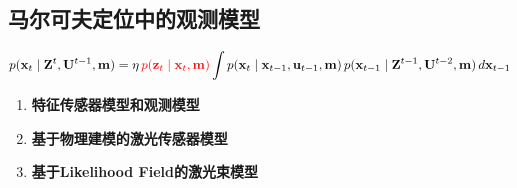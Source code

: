 \documentclass[../main.tex]{subfiles}
\begin{document}
\begin{enumerate}
\subsection{马尔可夫定位中的观测模型}
        \[
        p(\mathbf{x}_t \mid \mathbf{Z}^{t}, \mathbf{U}^{t-1}, \mathbf{m})
        = \eta \,\textcolor{red}{ p(\mathbf{z}_t \mid \mathbf{x}_t, \mathbf{m})}
        \int p(\mathbf{x}_t \mid \mathbf{x}_{t-1}, \mathbf{u}_{t-1}, \mathbf{m})
        \, p(\mathbf{x}_{t-1} \mid \mathbf{Z}^{t-1}, \mathbf{U}^{t-2}, \mathbf{m})
        \, d\mathbf{x}_{t-1}
        \]
            
\begin{enumerate}
    \item \textbf{特征传感器模型和观测模型}
    \item \textbf{基于物理建模的激光传感器模型}
    \item \textbf{基于Likelihood Field的激光束模型}
\end{enumerate}
\end{enumerate}
\end{document}
